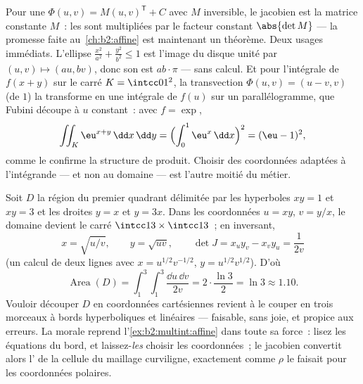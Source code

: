 \begin{example}\label{ex:b2:multint:affine}
Pour une  $\Phi(u, v) = M(u, v)^{\mathsf T} + C$ avec
$M$ inversible, le jacobien est la matrice constante $M$~:
les  sont multipliées par le facteur constant $\abs{\det M}$
--- la promesse faite au~\cref{ch:b2:affine} est maintenant un théorème.
Deux usages immédiats. L'ellipse $\frac{x^2}{a^2} +
\frac{y^2}{b^2} \leq 1$ est l'image du disque unité par
$(u, v) \mapsto (au, bv)$, donc son  est $ab \cdot \pi$ ---
sans calcul. Et pour l'intégrale de $f(x + y)$ sur le
carré $K = \intcc01^2$, la transvection $\Phi(u, v) = (u - v, v)$
(de  $1$) la transforme en une intégrale de $f(u)$ sur un
parallélogramme, que Fubini découpe à $u$ constant~: avec $f =
\exp$,
\[
\iint_K \eu^{x+y}\,\dd x\,\dd y
= \Bigl(\int_0^1 \eu^x\,\dd x\Bigr)^2 = (\eu - 1)^2,
\]
comme le confirme la structure de produit. Choisir des coordonnées
adaptées à l'intégrande --- et non au domaine --- est l'autre
moitié du métier.
\end{example}


\begin{example}\label{ex:b2:multint:hyperbolicregion}
Soit $D$ la région du premier quadrant délimitée par les
hyperboles $xy = 1$ et $xy = 3$ et les droites $y = x$ et
$y = 3x$. Dans les coordonnées $u = xy$, $v = y/x$, le domaine
devient le carré $\intcc13 \times \intcc13$~; en inversant,
\[
x = \sqrt{u/v}, \qquad y = \sqrt{uv},
\qquad
\det J = x_uy_v - x_vy_u = \frac{1}{2v}
\]
(un calcul de deux lignes avec $x = u^{1/2}v^{-1/2}$, $y =
u^{1/2}v^{1/2}$). D'où
\[
\operatorname{Area}(D)
= \int_1^3\!\!\int_1^3\frac{\dd u\,\dd v}{2v}
= 2\cdot\frac{\ln 3}{2} = \ln 3 \approx 1.10 .
\]
Vouloir découper $D$ en coordonnées cartésiennes revient à le couper
en trois morceaux à bords hyperboliques et linéaires ---
faisable, sans joie, et propice aux erreurs. La morale reprend
l'\cref{ex:b2:multint:affine} dans toute sa force~: lisez les
équations du bord, et laissez-\emph{les} choisir les
coordonnées~; le jacobien convertit alors l' de la cellule du
maillage curviligne, exactement comme $\rho$ le faisait pour les
coordonnées polaires.
\end{example}

